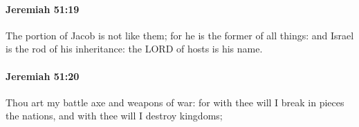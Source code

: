 		\paragraph{Jeremiah 51:19} %
			\label{JEREMIAH-51-19}

			The portion of Jacob is not like them; for he is the former of all things: and Israel is the rod of his inheritance: the LORD of hosts is his name.


		\paragraph{Jeremiah 51:20} %
			\label{JEREMIAH-51-20}

			Thou art my battle axe and weapons of war: for with thee will I break in pieces the nations, and with thee will I destroy kingdoms;


